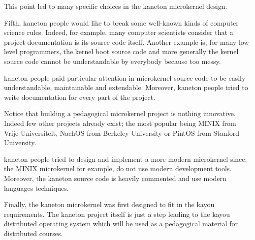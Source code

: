 This point led to many specific choices in the kaneton microkernel design.

Fifth, kaneton people would like to break some well-known kinds of
computer science rules. Indeed, for example, many computer scientists
consider that a project documentation is its source code itself.
Another example is, for many low-level programmers, the kernel boot source
code and more generally the kernel source code cannot be understandable by
everybody because too messy.

kaneton people paid particular attention in microkernel source code to be
easily understandable, maintainable and extendable. Moreover, kaneton
people tried to write documentation for every part of the project.

Notice that building a pedagogical microkernel project is nothing innovative.
Indeed few other projects already exist; the most popular being MINIX
from Vrije Universiteit, NachOS from Berkeley University or PintOS
from Stanford University.

kaneton people tried to design and implement a more modern microkernel
since, the MINIX microkernel for example, do not use modern development tools.
Moreover, the kaneton source code is heavily commented and use modern
languages techniques.

Finally, the kaneton microkernel was first designed to fit in the
kayou requirements. The kaneton project itself is just a step
leading to the kayou distributed operating system which will
be used as a pedagogical material for distributed courses.
